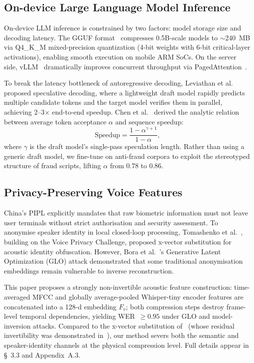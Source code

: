 \documentclass[11pt, a4paper]{article}
\begin{document}
\subsection{On-device Large Language Model Inference}

On-device LLM inference is constrained by two factors: model storage size and decoding latency. The GGUF format~\cite{17} compresses 0.5B-scale models to $\sim$240~MB via Q4\_K\_M mixed-precision quantization (4-bit weights with 6-bit critical-layer activations), enabling smooth execution on mobile ARM SoCs. On the server side, vLLM~\cite{18} dramatically improves concurrent throughput via PagedAttention~\cite{19}.

To break the latency bottleneck of autoregressive decoding, Leviathan et al.~\cite{20} proposed speculative decoding, where a lightweight draft model rapidly predicts multiple candidate tokens and the target model verifies them in parallel, achieving 2--3$\times$ end-to-end speedup. Chen et al.~\cite{21} derived the analytic relation between average token acceptance $\alpha$ and sequence speedup:
\begin{equation}
\text{Speedup} = \frac{1-\alpha^{\gamma+1}}{1-\alpha},
\end{equation}
where $\gamma$ is the draft model's single-pass speculation length. Rather than using a generic draft model, we fine-tune on anti-fraud corpora to exploit the stereotyped structure of fraud scripts, lifting $\alpha$ from 0.78 to 0.86.

\subsection{Privacy-Preserving Voice Features}

China's PIPL explicitly mandates that raw biometric information must not leave user terminals without strict authorisation and security assessment. To anonymise speaker identity in local closed-loop processing, Tomashenko et al.~\cite{22}, building on the Voice Privacy Challenge, proposed x-vector substitution for acoustic identity obfuscation. However, Bora et al.~\cite{23}'s Generative Latent Optimization (GLO) attack demonstrated that some traditional anonymisation embeddings remain vulnerable to inverse reconstruction.

This paper proposes a strongly non-invertible acoustic feature construction: time-averaged MFCC and globally average-pooled Whisper-tiny encoder features are concatenated into a 128-d embedding $F_v$; both compression steps destroy frame-level temporal dependencies, yielding WER~$\ge 0.95$ under GLO and model-inversion attacks. Compared to the x-vector substitution of~\cite{22} (whose residual invertibility was demonstrated in~\cite{23}), our method severs both the semantic and speaker-identity channels at the physical compression level. Full details appear in \S~3.3 and Appendix~A.3.
\end{document}
